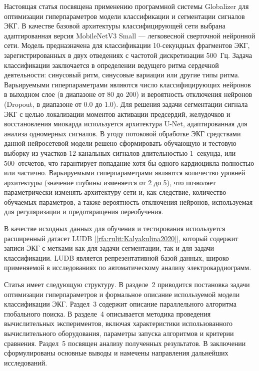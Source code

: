 \documentclass[10pt,a4paper]{book}
\begin{document}
Настоящая статья посвящена применению программной системы Globalizer для оптимизации гиперпараметров модели классификации и сегментации сигналов ЭКГ. В качестве базовой архитектуры классифицирующей сети выбрана адаптированная версия MobileNetV3 Small --- легковесной сверточной нейронной сети. Модель предназначена для классификации 10-секундных фрагментов ЭКГ, зарегистрированных в двух отведениях с частотой дискретизации 500~Гц. Задача классификации заключается в определении ведущего ритма сердечной деятельности: синусовый ритм, синусовые вариации или другие типы ритма. Варьируемыми гиперпараметрами являются число классифицирующих нейронов в выходном слое (в диапазоне от 80 до 200) и вероятность отключения нейронов (Dropout, в диапазоне от 0.0 до 1.0). Для решения задачи сегментации сигнала ЭКГ с целью локализации моментов активации предсердий, желудочков и восстановления миокарда используется архитектура U-Net, адаптированная для анализа одномерных сигналов. В угоду потоковой обработке ЭКГ средствами данной нейросетевой модели решено сформировать обучающую и тестовую выборку из участков 12-канальных сигналов длительностью 1~секунда, или 500~отсчетов, что гарантирует попадание хотя бы одного кардиоцикла полностью или частично. Варьируемыми гиперпараметрами являются количество уровней архитектуры (значение глубины изменяется от 2 до 5), что позволяет параметрически изменять архитектуру сети и, как следствие, количество обучаемых параметров, а также вероятность отключения нейронов, используемая для регуляризации и предотвращения переобучения.

В качестве исходных данных для обучения и тестирования используется расширенный датасет LUDB [\ref{rfa:rulit:Kalyakulina2020}], который содержит записи ЭКГ с метками как для задачи сегментации, так и для задачи классификации. LUDB является репрезентативной базой данных, широко применяемой в исследованиях по автоматическому анализу электрокардиограмм.

Статья имеет следующую структуру. В разделе~2 приводится постановка задачи оптимизации гиперпараметров и формальное описание используемой модели классификации ЭКГ. Раздел~3 содержит описание параллельного алгоритма глобального поиска. В разделе~4 описывается методика проведения вычислительных экспериментов, включая характеристики использованного вычислительного оборудования, параметры запуска алгоритмов и критерии сравнения. Раздел~5 посвящен анализу полученных результатов. В заключении сформулированы основные выводы и намечены направления дальнейших исследований.
\end{document}

